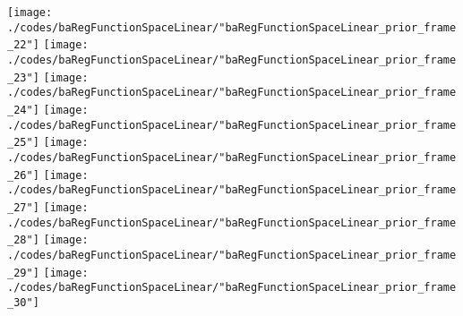 \begin{frame}{\insertsection}
\begin{center}
{\begin{animateinline}{15}
				 \texttt{[image: ./codes/baRegFunctionSpaceLinear/"baRegFunctionSpaceLinear\_prior\_frame\_22"]}\newframe
				 \texttt{[image: ./codes/baRegFunctionSpaceLinear/"baRegFunctionSpaceLinear\_prior\_frame\_23"]}\newframe
				 \texttt{[image: ./codes/baRegFunctionSpaceLinear/"baRegFunctionSpaceLinear\_prior\_frame\_24"]}\newframe
				 \texttt{[image: ./codes/baRegFunctionSpaceLinear/"baRegFunctionSpaceLinear\_prior\_frame\_25"]}\newframe
				 \texttt{[image: ./codes/baRegFunctionSpaceLinear/"baRegFunctionSpaceLinear\_prior\_frame\_26"]}\newframe
				 \texttt{[image: ./codes/baRegFunctionSpaceLinear/"baRegFunctionSpaceLinear\_prior\_frame\_27"]}\newframe
				 \texttt{[image: ./codes/baRegFunctionSpaceLinear/"baRegFunctionSpaceLinear\_prior\_frame\_28"]}\newframe
				 \texttt{[image: ./codes/baRegFunctionSpaceLinear/"baRegFunctionSpaceLinear\_prior\_frame\_29"]}\newframe
				 \texttt{[image: ./codes/baRegFunctionSpaceLinear/"baRegFunctionSpaceLinear\_prior\_frame\_30"]}
			 \end{animateinline}
			}
	\end{center}
    
\end{frame}

